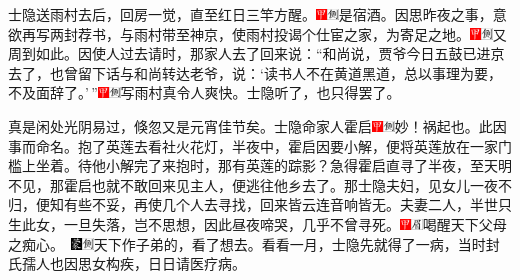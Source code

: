 士隐送雨村去后，回房一觉，直至红日三竿方醒。{\includegraphics[width=3mm]{../Images/00002}\includegraphics[width=3mm]{../Images/00011}\footnotesize 是宿酒。}因思昨夜之事，意欲再写两封荐书，与雨村带至神京，使雨村投谒个仕宦之家，为寄足之地。{\includegraphics[width=3mm]{../Images/00002}\includegraphics[width=3mm]{../Images/00011}\footnotesize 又周到如此。}因使人过去请时，那家人去了回来说：``和尚说，贾爷今日五鼓已进京去了，也曾留下话与和尚转达老爷，说：`读书人不在黄道黑道，总以事理为要，不及面辞了。'\,''{\includegraphics[width=3mm]{../Images/00002}\includegraphics[width=3mm]{../Images/00011}\footnotesize 写雨村真令人爽快。}士隐听了，也只得罢了。

真是闲处光阴易过，倏忽又是元宵佳节矣。士隐命家人霍启{\includegraphics[width=3mm]{../Images/00002}\includegraphics[width=3mm]{../Images/00011}\footnotesize 妙！祸起也。此因事而命名。}抱了英莲去看社火花灯，半夜中，霍启因要小解，便将英莲放在一家门槛上坐着。待他小解完了来抱时，那有英莲的踪影？急得霍启直寻了半夜，至天明不见，那霍启也就不敢回来见主人，便逃往他乡去了。那士隐夫妇，见女儿一夜不归，便知有些不妥，再使几个人去寻找，回来皆云连音响皆无。夫妻二人，半世只生此女，一旦失落，岂不思想，因此昼夜啼哭，几乎不曾寻死。{{\includegraphics[width=3mm]{../Images/00002}\includegraphics[width=3mm]{../Images/00010}\footnotesize  喝醒天下父母之痴心。　}\includegraphics[width=3mm]{../Images/00006}\includegraphics[width=3mm]{../Images/00011}\footnotesize 天下作子弟的，看了想去。}看看一月，士隐先就得了一病，当时封氏孺人也因思女构疾，日日请医疗病。

